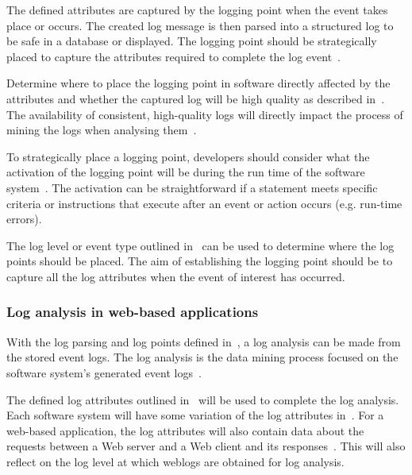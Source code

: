 The defined attributes are captured by the logging point when the event takes place or occurs. The created log message is then parsed into a structured log to be safe in a database or displayed. The logging point should be strategically placed to capture the attributes required to complete the log event~\cite{Fedaghi2010}.\par Determine where to place the logging point in software directly affected by the attributes and whether the captured log will be high quality as described in~. The availability of consistent, high-quality logs will directly impact the process of mining the logs when analysing them~\cite{Kherbouche2017}. \par To strategically place a logging point, developers should consider what the activation of the logging point will be during the run time of the software system~\cite{Pecchia2015, Cinque2013}. The activation can be straightforward if a statement meets specific criteria or instructions that execute after an event or action occurs (e.g. run-time errors). \par The log level or event type outlined in~ can be used to determine where the log points should be placed. The aim of establishing the logging point should be to capture all the log attributes when the event of interest has occurred.

\subsubsection{Log analysis in web-based applications}
With the log parsing and log points defined in~, a log analysis can be made from the stored event logs. The log analysis is the data mining process focused on the software system's generated event logs~\cite{Slaninova2014,Hasiloglu2018}. \par The defined log attributes outlined in~ will be used to complete the log analysis. Each software system will have some variation of the log attributes in~. For a web-based application, the log attributes will also contain data about the requests between a Web server and a Web client and its responses~\cite{Slaninova2014, Dhanalakshmi2016}. This will also reflect on the log level at which weblogs are obtained for log analysis.

